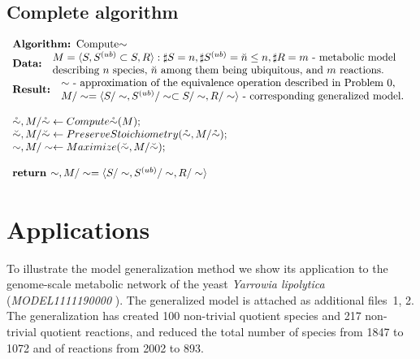 \documentclass[9pt]{article}
\begin{document}
\subsection*{Complete algorithm}
\[ \begin{array}{l}
\mbox{\textbf{Algorithm: }Compute${\sim}$}\\
\mbox{\textbf{Data: }}\begin{array}{l}\mbox{$M=\langle{S, S^{(ub)}\subset{S}, R}\rangle: \sharp S = n, \sharp S^{(ub)}=\breve{n} \leq n, \sharp R = m$ - metabolic model}\\ \mbox{describing $n$ species,  $\breve{n}$ among them being ubiquitous,  and $m$ reactions.}\end{array}\\
\mbox{\textbf{Result: }}\begin{array}{l}\mbox{$\sim$ - approximation of the equivalence operation described in Problem~0,}\\ \mbox{$M/\sim = \langle S/\sim, S^{(ub)}/\sim \subset S/\sim, R/\sim \rangle$ - corresponding generalized model.}\end{array}\\
\mbox{~}\\
\mbox{$\mathring{\sim}, M/\mathring{\sim} \leftarrow Compute\mathring{\sim}(M);$} \\
\mbox{$\breve{\sim}, M/\breve{\sim} \leftarrow PreserveStoichiometry(\mathring{\sim}, M/{\mathring{\sim}});$} \\
\mbox{$\sim, M/\sim \leftarrow Maximize(\breve{\sim}, M/\breve{\sim});$} \\
\mbox{~}\\
\mbox{\textbf{return }$\sim, M/\sim = \langle S/\sim, S^{(ub)}/\sim, R/\sim \rangle$}
\end{array} \]

\newpage
\section*{Applications}
To illustrate the model generalization method we show its application to the genome-scale metabolic network of the yeast \textit{Yarrowia lipolytica} (\emph{MODEL1111190000} \citep{Loira12}). The generalized model is attached as additional files~1, 2. The generalization has created 100 non-trivial quotient species and 217 non-trivial quotient reactions, and reduced  the total number of species from 1847 to 1072 and of reactions from 2002 to 893. %
\end{document}
